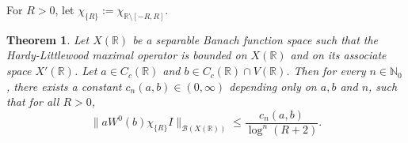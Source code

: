 \documentclass[reqno]{amsproc}
\newcommand{\cB}{\mathcal{B}}
\newcommand{\R}{\mathbb{R}}
\newtheorem{theorem}{Theorem}[section]
\theoremstyle{definition}
\theoremstyle{remark}
\numberwithin{equation}{section}
\begin{document}
For $R>0$, let $\chi_{\{R\}} := \chi_{\mathbb{R}\setminus[-R, R]}$.
\begin{theorem}\label{th:key-estimate}
Let $X(\mathbb{R})$ be a separable Banach function space such 
that the Hardy-Littlewood maximal operator is bounded on $X(\R)$ 
and on its associate space $X'(\mathbb{R})$. 
Let $a \in C_c(\R)$ and $b \in C_c(\mathbb{R})\cap V(\mathbb{R})$. 
Then for every $n \in \mathbb{N}_0$, there exists a constant 
$c_n(a,b)\in (0,\infty)$ depending only on $a,b$ and $n$,
such that for all $R>0$,
\begin{equation}\label{eq:key-estimate-0}
\|aW^0(b)\chi_{\{R\}}I\|_{\cB(X(\R))} \le \frac{c_n(a,b)}{\log^n(R + 2)}.
\end{equation}
\end{theorem}
\end{document}
